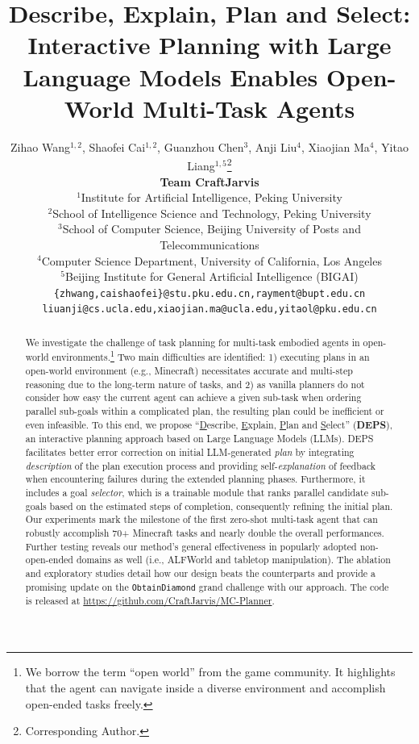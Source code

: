\documentclass{article}
\title{Describe, Explain, Plan and Select: \\Interactive Planning with Large Language Models Enables Open-World Multi-Task Agents}
\author{
  Zihao Wang$^{1,2}$, Shaofei Cai$^{1,2}$, Guanzhou Chen$^{3}$, Anji Liu$^{4}$, Xiaojian Ma$^{4}$, Yitao Liang$^{1,5}$\thanks{Corresponding Author.} \vspace{5pt} \\ 
  {\bf\large Team CraftJarvis} \vspace{5pt} \\
    $^{1}$Institute for Artificial Intelligence, Peking University\\
    $^{2}$School of Intelligence Science and Technology, Peking University \\
    $^{3}$School of Computer Science, Beijing University of Posts and Telecommunications \\
    $^{4}$Computer Science Department, University of California, Los Angeles \\
    $^{5}$Beijing Institute for General Artificial Intelligence (BIGAI)\\
    {\tt \small \{zhwang,caishaofei\}@stu.pku.edu.cn,rayment@bupt.edu.cn} \\
    {\tt \small liuanji@cs.ucla.edu,xiaojian.ma@ucla.edu,yitaol@pku.edu.cn} 
}
\begin{document}



\maketitle

\begin{abstract}
  We investigate the challenge of task planning for multi-task embodied agents in open-world environments.\footnote{We borrow the term ``open world'' from the game community. It highlights that the agent can navigate inside a diverse environment and accomplish open-ended tasks freely.\vspace{-15pt}}
  Two main difficulties are identified: 1) executing plans in an open-world environment (e.g., Minecraft) necessitates accurate and multi-step reasoning due to the long-term nature of tasks, and 2) as vanilla planners do not consider how easy the current agent can achieve a given sub-task when ordering parallel sub-goals within a complicated plan, the resulting plan could be inefficient or even infeasible.
  To this end, we propose ``\underline{D}escribe, \underline{E}xplain, \underline{P}lan and \underline{S}elect'' (\textbf{DEPS}), an interactive planning approach based on Large Language Models (LLMs). DEPS facilitates better error correction on initial LLM-generated \textit{plan} by integrating \textit{description} of the plan execution process and providing self-\textit{explanation} of feedback when encountering failures during the extended planning phases. Furthermore, it includes a goal \textit{selector}, which is a trainable module that ranks parallel candidate sub-goals based on the estimated steps of completion, consequently refining the initial plan.
  Our experiments mark the milestone of the first zero-shot multi-task agent that can robustly accomplish 70+ Minecraft tasks and nearly double the overall performances.
  Further testing reveals our method's general effectiveness in popularly adopted non-open-ended domains as well (i.e., ALFWorld and tabletop manipulation). 
  The ablation and exploratory studies detail how our design beats the counterparts and provide a promising update on the \texttt{ObtainDiamond} grand challenge with our approach. 
  The code is released at \url{https://github.com/CraftJarvis/MC-Planner}.
\end{abstract}
\end{document}
